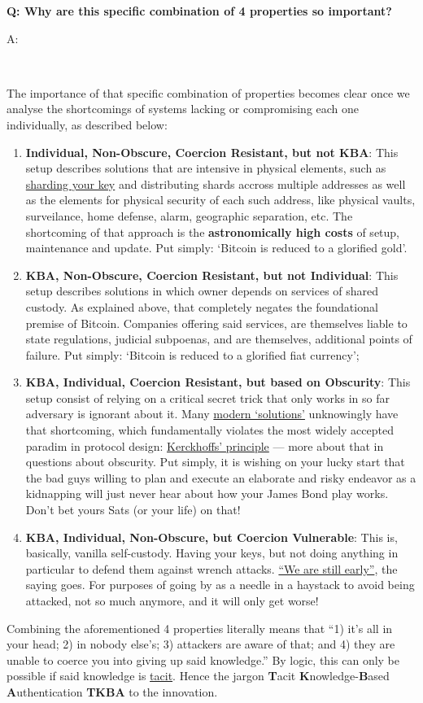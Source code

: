 \documentclass[12pt,a4paper]{article}
\newenvironment{question}[1]{%
  \vspace{0.8em}\noindent\textbf{Q: #1}\par
  \vspace{0.2em}\noindent\begin{itshape}A:\end{itshape}~%
}{\vspace{0.8em}}
\begin{document}
\begin{question}{Why are this specific combination of 4 properties so important?}
 The importance of that specific combination of properties becomes clear once we analyse the shortcomings of systems lacking or compromising each one individually, as described below:
 \begin{enumerate}
  \item \textbf{Individual, Non-Obscure, Coercion Resistant, but not KBA}: This setup describes solutions that are intensive in physical elements, such as \href{https://iancoleman.io/shamir39/}{sharding your key} and distributing shards accross multiple addresses as well as the elements for physical security of each such address, like physical vaults, surveilance, home defense, alarm, geographic separation, etc. The shortcoming of that approach is the \textbf{astronomically high costs} of setup, maintenance and update. Put simply: `Bitcoin is reduced to a glorified gold'.
  \item \textbf{KBA, Non-Obscure, Coercion Resistant, but not Individual}: This setup describes solutions in which owner depends on services of shared custody. As explained above, that completely negates the foundational premise of Bitcoin. Companies offering said services, are themselves liable to state regulations, judicial subpoenas, and are themselves, additional points of failure. Put simply: `Bitcoin is reduced to a glorified fiat currency';
  \item \textbf{KBA, Individual, Coercion Resistant, but based on Obscurity}: This setup consist of relying on a critical secret trick that only works in so far adversary is ignorant about it. Many \href{https://rewindbitcoin.com/}{modern `solutions'} unknowingly have that shortcoming, which fundamentally violates the most widely accepted paradim in protocol design: \href{https://en.wikipedia.org/wiki/Kerckhoffs's_principle}{Kerckhoffs' principle} --- more about that in questions about obscurity. Put simply, it is wishing on your lucky start that the bad guys willing to plan and execute an elaborate and risky endeavor as a kidnapping will just never hear about how your James Bond play works. Don't bet yours Sats (or your life) on that!
  \item \textbf{KBA, Individual, Non-Obscure, but Coercion Vulnerable}: This is, basically, vanilla self-custody. Having your keys, but not doing anything in particular to defend them against wrench attacks. \href{https://duckduckgo.com/?q=\%22we+are+still+early\%22+bitcoin&t=brave&ia=web}{``We are still early''}, the saying goes. For purposes of going by as a needle in a haystack to avoid being attacked, not so much anymore, and it will only get worse!
 \end{enumerate}
Combining the aforementioned 4 properties literally means that ``1) it's all in your head; 2) in nobody else's; 3) attackers are aware of that; and 4) they are unable to coerce you into giving up said knowledge.'' By logic, this can only be possible if said knowledge is \href{https://en.wikipedia.org/wiki/Tacit_knowledge}{tacit}. Hence the jargon \textbf{T}acit \textbf{K}nowledge-\textbf{B}ased \textbf{A}uthentication \textbf{TKBA} to the innovation.
\end{question}
\end{document}
